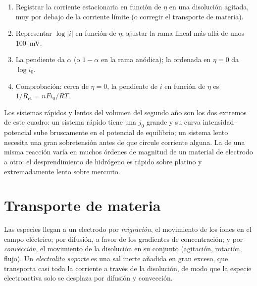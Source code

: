 \begin{method}\label{met:b3:electrode-kinetics:tafel-analysis}
\begin{enumerate}
  \item Registrar la corriente estacionaria en función de $\eta$ en una disolución agitada, muy por debajo de la
        corriente límite (o corregir el transporte de materia).
  \item Representar $\log|i|$ en función de $\eta$; ajustar la rama lineal más allá de unos \qty{100}{mV}.
  \item La pendiente da $\alpha$ (o $1 - \alpha$ en la rama anódica); la ordenada en $\eta = 0$
        da $\log i_0$.
  \item Comprobación: cerca de $\eta = 0$, la pendiente de $i$ en función de $\eta$ es $1/R_{\mathrm{ct}} = nFi_0/RT$.
\end{enumerate}
\end{method}

Los sistemas rápidos y lentos del volumen del segundo año son los dos extremos de este
cuadro: un sistema rápido tiene una $j_0$ grande y su curva intensidad--potencial sube
bruscamente en el potencial de equilibrio; un sistema lento necesita una gran sobretensión
antes de que circule corriente alguna. La  de una misma reacción
varía en muchos órdenes de magnitud de un material de electrodo a otro:
el desprendimiento de hidrógeno es rápido sobre platino y extremadamente lento sobre mercurio.

\section{Transporte de materia}

\begin{definition}\label{def:b3:electrode-kinetics:transport}
Las especies llegan a un electrodo por \emph{migración}, el movimiento de los iones
en el campo eléctrico; por difusión, a favor de los gradientes de concentración; y por
\emph{convección}, el movimiento de la disolución en su conjunto
(agitación, rotación, flujo). Un \emph{electrolito soporte}
es una sal inerte añadida en gran exceso, que transporta casi toda
la corriente a través de la disolución, de modo que la especie electroactiva solo se desplaza por
difusión y convección.
\end{definition}

